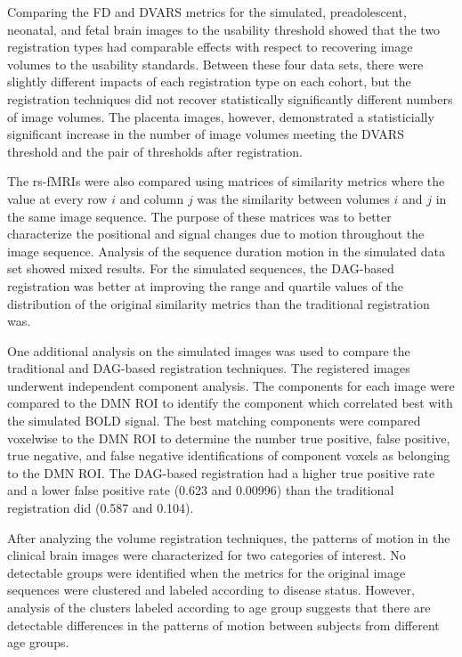 Comparing the FD and DVARS metrics for the simulated, preadolescent, neonatal, and fetal brain images to the usability threshold showed that the two registration types had comparable effects with respect to recovering image volumes to the usability standards. Between these four data sets, there were slightly different impacts of each registration type on each cohort, but the registration techniques did not recover statistically significantly different numbers of image volumes. The placenta images, however, demonstrated a statisticially significant increase in the number of image volumes meeting the DVARS threshold and the pair of thresholds after registration.

The rs-fMRIs were also compared using matrices of similarity metrics where the value at every row $i$ and column $j$ was the similarity between volumes $i$ and $j$ in the same image sequence. The purpose of these matrices was to better characterize the positional and signal changes due to motion throughout the image sequence. Analysis of the sequence duration motion in the simulated data set showed mixed results. For the simulated sequences, the DAG-based registration was better at improving the range and quartile values of the distribution of the original similarity metrics than the traditional registration was.

One additional analysis on the simulated images was used to compare the traditional and DAG-based registration techniques. The registered images underwent independent component analysis. The components for each image were compared to the DMN ROI to identify the component which correlated best with the simulated BOLD signal. The best matching components were compared voxelwise to the DMN ROI to determine the number true positive, false positive, true negative, and false negative identifications of component voxels as belonging to the DMN ROI. The DAG-based registration had a higher true positive rate and a lower false positive rate (0.623 and 0.00996) than the traditional registration did (0.587 and 0.104).

After analyzing the volume registration techniques, the patterns of motion in the clinical brain images were characterized for two categories of interest. No detectable groups were identified when the metrics for the original image sequences were clustered and labeled according to disease status. However, analysis of the clusters labeled according to age group suggests that there are detectable differences in the patterns of motion between subjects from different age groups.

